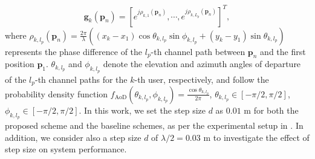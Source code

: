 \documentclass[12pt, draftclsnofoot, onecolumn]{IEEEtran}
\begin{document}
\begin{equation}
    \mathbf{g}_k(\mathbf{p}_n)=\left[e^{j\rho_{k,1}(\mathbf{p}_n)},\cdots,e^{j\rho_{k,L_p}(\mathbf{p}_n)}\right]^T,
\end{equation}
where $\rho_{k,l_p}(\mathbf{p}_n)=\frac{2\pi}{\lambda}\left((x_k-x_1)\cos\theta_{k,l_p}\sin\phi_{k,l_p}+(y_k-y_1)\sin\theta_{k,l_p}\right)$ represents the phase difference of the $l_p$-th channel path between $\mathbf{p}_n$ and the first position $\mathbf{p}_1$. $\theta_{k,l_p}$ and $\phi_{k,l_p}$ denote the
elevation and azimuth angles of departure of the $l_p$-th channel paths for the $k$-th user, respectively, and follow the probability density function $f_{\mathrm{AoD}}(\theta_{k,l_p}, \phi_{k,l_p})=\frac{\cos\theta_{k,l_p}}{2\pi}$, $\theta_{k,l_p}\in [- \pi/2,\pi/2]$, $\phi_{k,l_p}\in [- \pi/2,\pi/2]$. 
In this work, we set the step size $d$ as $0.01$ m for both the proposed scheme and the baseline schemes, as per the experimental setup in \cite{zhuravlev2015experimental}. In addition, we consider also a step size $d$ of $\lambda/2=0.03$ m to investigate the effect of step size on system performance. %
\end{document}
